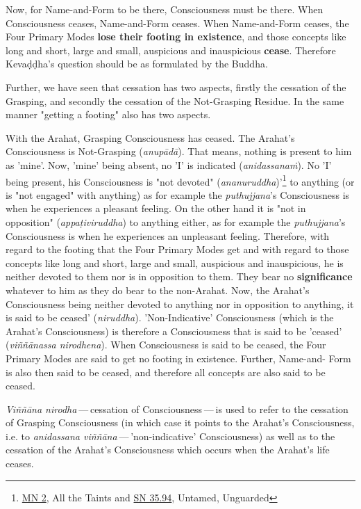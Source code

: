 Now, for Name-and-Form to be there, Consciousness must be there. When
Consciousness ceases, Name-and-Form ceases. When Name-and-Form ceases,
the Four Primary Modes \textbf{lose their footing in existence}, and those
concepts like long and short, large and small, auspicious and
inauspicious \textbf{cease}. Therefore Kevaḍḍha’s question should be as
formulated by the Buddha.


Further, we have seen that cessation has two aspects, firstly the
cessation of the Grasping, and secondly the cessation of the
Not-Grasping Residue. In the same manner "getting a footing" also has
two aspects.


With the Arahat, Grasping Consciousness has ceased. The Arahat’s
Consciousness is Not-Grasping (\emph{anupādā}). That means, nothing is
present to him as 'mine'. Now, 'mine' being absent, no 'I' is indicated
(\emph{anidassanaṁ}). No 'I' being present, his Consciousness is "not devoted"
(\emph{ananuruddha})'\footnote{\href{https://suttacentral.net/mn2/en/bodhi}{MN 2}, All the Taints and \href{https://suttacentral.net/sn35.94/en/bodhi}{SN 35.94}, Untamed, Unguarded}
to anything (or is "not engaged" with anything) as for example the \emph{puthujjana}'s
Consciousness is when he experiences a pleasant feeling. On the other
hand it is "not in opposition" (\emph{appaṭiviruddha}) to anything either,
as for example the \emph{puthujjana}'s Consciousness is when he experiences
an unpleasant feeling. Therefore, with regard to the footing that the
Four Primary Modes get and with regard to those concepts like long and
short, large and small, auspicious and inauspicious, he is neither
devoted to them nor is in opposition to them. They bear no
\textbf{significance} whatever to him as they do bear to the non-Arahat. Now,
the Arahat’s Consciousness being neither devoted to anything nor in
opposition to anything, it is said to be ceased' (\emph{niruddha}).
'Non-Indicative' Consciousness (which is the Arahat’s Consciousness) is
therefore a Consciousness that is said to be 'ceased' (\emph{viññānassa
nirodhena}). When Consciousness is said to be ceased, the Four Primary
Modes are said to get no footing in existence. Further, Name-and- Form
is also then said to be ceased, and therefore all concepts are also said
to be ceased.


\emph{Viññāna nirodha} — cessation of Consciousness — is used to refer to the
cessation of Grasping Consciousness (in which case it points to the
Arahat’s Consciousness, i.e. to \emph{anidassana viññāna} — 'non-indicative'
Consciousness) as well as to the cessation of the Arahat’s Consciousness
which occurs when the Arahat’s life ceases.


